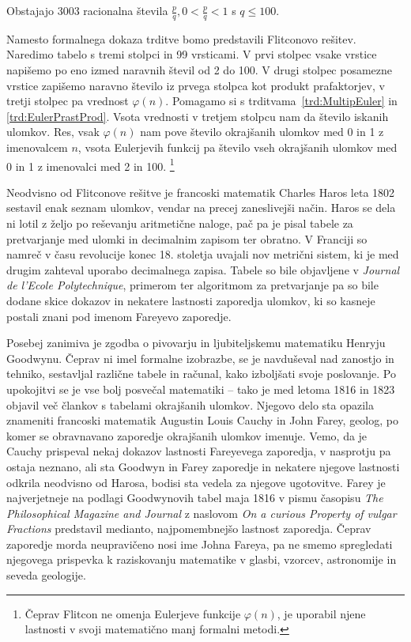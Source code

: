 \documentclass[mat1]{fmfdelo}
\begin{document}
\begin{trditev}
Obstajajo 3003 racionalna števila $\frac{p}{q}, 0 < \frac{p}{q} < 1$ s $q \leq 100$.
\end{trditev}

Namesto formalnega dokaza trditve bomo predstavili Flitconovo rešitev. Naredimo tabelo s tremi stolpci in 99 vrsticami. V prvi stolpec vsake vrstice napišemo po eno izmed naravnih števil od 2 do 100. V drugi stolpec posamezne vrstice zapišemo naravno število iz prvega stolpca kot produkt prafaktorjev, v tretji stolpec pa vrednost $\varphi(n)$. Pomagamo si s trditvama~\ref{trd:MultipEuler} in \ref{trd:EulerPrastProd}. Vsota vrednosti v tretjem stolpcu nam da število iskanih ulomkov. Res, vsak $\varphi(n)$ nam pove število okrajšanih ulomkov med 0 in 1 z imenovalcem $n$, vsota Eulerjevih funkcij pa število vseh okrajšanih ulomkov med 0 in 1 z imenovalci med 2 in 100. \footnote{Čeprav Flitcon ne omenja Eulerjeve funkcije $\varphi(n)$, je uporabil njene lastnosti v svoji matematično manj formalni metodi.}

Neodvisno od Flitconove rešitve je francoski matematik Charles Haros leta 1802 sestavil enak seznam ulomkov, vendar na precej zaneslivejši način. Haros se dela ni lotil z željo po reševanju aritmetične naloge, pač pa je pisal tabele za pretvarjanje med ulomki in decimalnim zapisom ter obratno. V Franciji so namreč v času revolucije konec 18. stoletja uvajali nov metrični sistem, ki je med drugim zahteval uporabo decimalnega zapisa. Tabele so bile objavljene v \emph{Journal de l'Ecole Polytechnique}, primerom ter algoritmom za pretvarjanje pa so bile dodane skice dokazov in nekatere lastnosti zaporedja ulomkov, ki so kasneje postali znani pod imenom Fareyevo zaporedje. 

Posebej zanimiva je zgodba o pivovarju in ljubiteljskemu matematiku Henryju Goodwynu. Čeprav ni imel formalne izobrazbe, se je navduševal nad zanostjo in tehniko, sestavljal različne tabele in računal, kako izboljšati svoje poslovanje. Po upokojitvi se je vse bolj posvečal matematiki -- tako je med letoma 1816 in 1823 objavil več člankov s tabelami okrajšanih ulomkov. Njegovo delo sta opazila znameniti francoski matematik Augustin Louis Cauchy in John Farey, geolog, po komer se obravnavano zaporedje okrajšanih ulomkov imenuje. Vemo, da je Cauchy prispeval nekaj dokazov lastnosti Fareyevega zaporedja, v nasprotju pa ostaja neznano, ali sta Goodwyn in Farey zaporedje in nekatere njegove lastnosti odkrila neodvisno od Harosa, bodisi sta vedela za njegove ugotovitve. Farey je najverjetneje na podlagi Goodwynovih tabel maja 1816 v pismu časopisu \emph{The Philosophical Magazine and Journal} z naslovom \emph{On a curious Property of vulgar Fractions} predstavil medianto, najpomembnejšo lastnost zaporedja. Čeprav zaporedje morda neupravičeno nosi ime Johna Fareya, pa ne smemo spregledati njegovega prispevka k raziskovanju matematike v glasbi, vzorcev, astronomije in seveda geologije.
\end{document}
